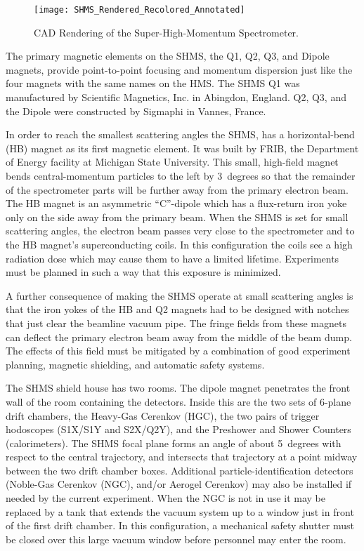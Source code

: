 {\begin{figure}
\texttt{[image: SHMS\_Rendered\_Recolored\_Annotated]}
\caption{CAD Rendering of the Super-High-Momentum Spectrometer. \label{fig:SHMS_CAD_Model}}
\end{figure}

The primary magnetic elements on the SHMS, the Q1, Q2, Q3, and Dipole magnets, provide
point-to-point focusing and momentum dispersion just like the four magnets with
the same names on the HMS. The SHMS Q1 was 
manufactured by Scientific Magnetics, Inc. in Abingdon, England. Q2, Q3, and
the Dipole were constructed by Sigmaphi in Vannes, France.

In order to reach the smallest scattering angles the SHMS, has a horizontal-bend
(HB) magnet as its first magnetic element. It was built by FRIB, the Department of Energy
facility at Michigan State  University. This small, high-field magnet bends
central-momentum particles to the left by 3~degrees so that the remainder of the
spectrometer parts will be further away from the primary electron beam. The HB
magnet is an asymmetric ``C''-dipole which has a flux-return iron yoke only on
the side away from the primary beam. When the SHMS is set for small scattering 
angles, the electron beam passes very close to the spectrometer and to the
HB magnet's superconducting
coils. In this configuration the coils see a high radiation dose which may cause
them to have a limited 
lifetime. Experiments must be planned in such a way that this exposure is minimized.

A further consequence of making the SHMS operate at small scattering angles is
that the iron yokes of the HB and Q2 magnets had to be designed with notches 
that just clear the beamline vacuum pipe. The fringe fields from these magnets can
deflect the primary electron beam away from the middle of the beam dump. 
The effects of this field
must be mitigated by a combination of good experiment planning, magnetic shielding, 
and automatic safety systems.

The SHMS shield house has two rooms. The dipole magnet penetrates the front
wall of the room containing the detectors. Inside this are the two sets of 6-plane
drift chambers, the Heavy-Gas Cerenkov (HGC), the two pairs of trigger hodoscopes 
(S1X/S1Y and S2X/Q2Y), and
the Preshower and Shower Counters (calorimeters). The SHMS focal plane forms an 
angle of about 5~degrees with respect to the central trajectory, 
and intersects that trajectory at
a point midway between the two drift chamber boxes. Additional  particle-identification
detectors (Noble-Gas Cerenkov (NGC), and/or Aerogel Cerenkov) may also be 
installed if needed by the current experiment. When the NGC is not in use it may
be replaced by a tank that extends the vacuum system up  to a window just in
front of the first drift chamber. In this configuration, a mechanical safety shutter
must be closed over this large vacuum window before personnel may enter the
room.

}
